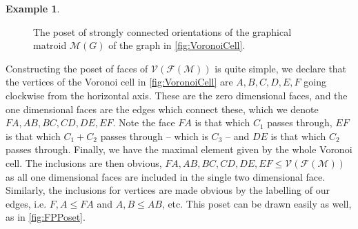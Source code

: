 \documentclass[12pt]{report}
\theoremstyle{definition}
\newtheorem{example}[theorem]{Example}
\def\calF{\mathcal F}
\def\calM{\mathcal M}
\def\calV{\mathcal V}
\theoremstyle{upright}
\begin{document}
\begin{example}
\begin{figure}[htbp]
\begin{center}
        
        \end{center}
    
        \caption{The poset of strongly connected orientations of the graphical matroid $\calM(G)$ of the graph in \cref{fig:VoronoiCell}.}\label{fig:SCPoset}
    
    \end{figure}

    Constructing the poset of faces of $\calV(\calF(\calM))$ is quite simple, we declare that the vertices of the Voronoi cell in \cref{fig:VoronoiCell} are $A, B, C, D, E, F$ going clockwise from the horizontal axis.
    These are the zero dimensional faces, and the one dimensional faces are the edges which connect these, which we denote $FA, AB, BC, CD, DE, EF$.
    Note the face $FA$ is that which $C_1$ passes through, $EF$ is that which $C_1+C_2$ passes through -- which is $C_3$ -- and $DE$ is that which $C_2$ passes through.
    Finally, we have the maximal element given by the whole Voronoi cell.
    The inclusions are then obvious, $FA, AB, BC, CD, DE, EF\leq\calV(\calF(\calM))$ as all one dimensional faces are included in the single two dimensional face.
    Similarly, the inclusions for vertices are made obvious by the labelling of our edges, i.e. $F, A\leq FA$ and $A, B\leq AB$, etc.
    This poset can be drawn easily as well, as in \cref{fig:FPPoset}.

    \begin{figure}[htbp]


\end{figure}
\end{example}
\end{document}
